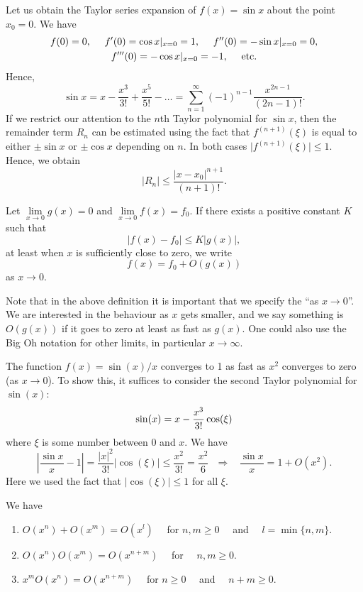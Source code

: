 \begin{example}
Let us obtain the Taylor series expansion of
$f(x)=\sin x$ about the point $x_{0}=0$.
We have
\begin{gather*}
f(0)=0, ~~~~ f^{\prime}(0)=\cos x\vert_{x=0}=1, ~~~~
f^{\prime\prime}(0)=-\sin x\vert_{x=0}=0, \\
f^{\prime\prime\prime}(0)=-\cos x\vert_{x=0}=-1, ~~~~
{\rm etc.}
\end{gather*}
Hence,
\[
\sin x=x-\frac{x^{3}}{3!}+\frac{x^{5}}{5!}-\dots=
\sum_{n=1}^{\infty}(-1)^{n-1}\frac{x^{2n-1}}{(2n-1)!}.
\]
If we restrict our attention to the $n$th Taylor polynomial for
$\sin x$, then the remainder term $R_{n}$ can be estimated using the
fact that $f^{(n+1)}(\xi)$ is equal to
either $\pm\sin x$ or $\pm\cos x$ depending on $n$. In both cases
$\vert f^{(n+1)}(\xi)\vert\leq 1$. Hence, we obtain
\[
\vert R_{n}\vert \leq\frac{\vert x-x_{0}\vert^{n+1}}{(n+1)!}.
\]
\end{example}

\begin{definition} Let $\lim\limits_{x\to 0}g(x)=0$ and
$\lim\limits_{x\to 0}f(x)=f_{0}$. If there exists
a positive constant $K$ such that
\[
\vert f(x)-f_{0}\vert   \leq K \vert g(x)\vert,
\]
at least when $x$ is sufficiently close to zero, we write
\[
f(x)=f_{0}+O(g(x))
\]
as $x\to 0$.
\end{definition}
Note that in the above definition it is important that we specify the ``as $x\to 0$''.
We are interested in the behaviour as $x$ gets smaller, and we say something is
$O(g(x))$ if it goes to zero at least as fast as $g(x)$.
One could also use the Big Oh notation for other limits, in particular $x\to\infty$.

\begin{example}
The function $f(x)=\sin(x)/x$ converges to 1 as fast
as $x^{2}$ converges to zero (as $x\to 0$). To show this,
it suffices to consider the second Taylor polynomial for $\sin(x)$:
\[
\sin(x)=x-{x^{3} \over 3!}\cos(\xi)
\]
where $\xi$ is some number between 0 and $x$. We have
\[
\left\vert \frac{\sin x}{x} -1 \right\vert = \frac{\vert x
\vert^{2}}{3!}\vert \cos(\xi)\vert \leq \frac{x^{2}}{3!}=\frac{x^{2}}{6} \ \ \
\Rightarrow \ \ \ \ \frac{\sin x}{x}=1+O(x^{2}).
\]
Here we used the fact that $\vert\cos(\xi)\vert\leq 1$ for all $\xi$.
\end{example}

\begin{lemma}[Properties of $O(x^n)$ as $x\to 0$]
We have
\begin{enumerate}

\item $O(x^n)+O(x^m)=O(x^l)$ \ \ for $n,m \geq 0$ \ \ and \ \ $l=\min\{n,m\}$.

\item $O(x^n)O(x^m)=O(x^{n+m})$ \ \ for \ \ $n,m \geq 0$.

\item $x^m O(x^n)=O(x^{n+m})$ \ \ for $n \geq 0$ \ \ and \ \ $n+m \geq 0$.
\end{enumerate}
\end{lemma}

